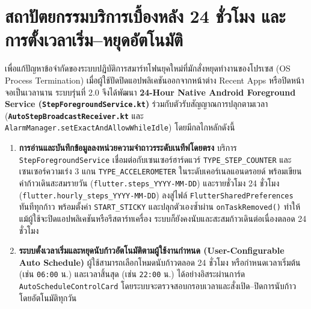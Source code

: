 \section{สถาปัตยกรรมบริการเบื้องหลัง 24 ชั่วโมง และการตั้งเวลาเริ่ม--หยุดอัตโนมัติ}
เพื่อแก้ปัญหาข้อจำกัดของระบบปฏิบัติการสมาร์ทโฟนยุคใหม่ที่มักสั่งหยุดทำงานของโปรเซส (OS Process Termination) เมื่อผู้ใช้ปัดปิดแอปพลิเคชันออกจากหน้าต่าง Recent Apps หรือปิดหน้าจอเป็นเวลานาน ระบบรุ่นที่ 2.0 จึงได้พัฒนา \textbf{24-Hour Native Android Foreground Service (\texttt{StepForegroundService.kt})} ร่วมกับตัวรับสัญญาณการปลุกตามเวลา (\textbf{\texttt{AutoStepBroadcastReceiver.kt}} และ \texttt{AlarmManager.setExactAndAllowWhileIdle}) โดยมีกลไกหลักดังนี้
\begin{enumerate}
    \item \textbf{การอ่านและบันทึกข้อมูลลงหน่วยความจำถาวรระดับเนทีฟโดยตรง} บริการ \texttt{StepForegroundService} เชื่อมต่อกับเซนเซอร์ฮาร์ดแวร์ \texttt{TYPE\_STEP\_COUNTER} และเซนเซอร์ความเร่ง 3 แกน \texttt{TYPE\_ACCELEROMETER} ในระดับเคอร์เนลแอนดรอยด์ พร้อมเขียนค่าก้าวเดินสะสมรายวัน (\texttt{flutter.steps\_YYYY-MM-DD}) และรายชั่วโมง 24 ชั่วโมง (\texttt{flutter.hourly\_steps\_YYYY-MM-DD}) ลงสู่ไฟล์ \texttt{FlutterSharedPreferences} ทันทีทุกก้าว พร้อมตั้งค่า \texttt{START\_STICKY} และปลุกตัวเองซ้ำผ่าน \texttt{onTaskRemoved()} ทำให้แม้ผู้ใช้จะปิดแอปพลิเคชันหรือรีสตาร์ทเครื่อง ระบบก็ยังคงนับและสะสมก้าวเดินต่อเนื่องตลอด 24 ชั่วโมง
    \item \textbf{ระบบตั้งเวลาเริ่มและหยุดนับก้าวอัตโนมัติตามผู้ใช้งานกำหนด (User-Configurable Auto Schedule)} ผู้ใช้สามารถเลือกโหมดนับก้าวตลอด 24 ชั่วโมง หรือกำหนดเวลาเริ่มต้น (เช่น \texttt{06:00} น.) และเวลาสิ้นสุด (เช่น \texttt{22:00} น.) ได้อย่างอิสระผ่านการ์ด \texttt{AutoScheduleControlCard} โดยระบบจะตรวจสอบกรอบเวลาและสั่งเปิด--ปิดการนับก้าวโดยอัตโนมัติทุกวัน
\end{enumerate}

